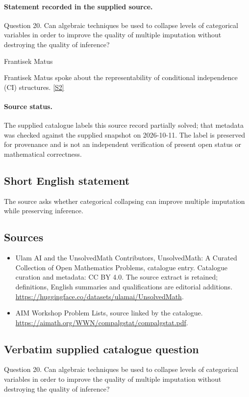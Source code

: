\documentclass[11pt]{article}
\begin{document}
\paragraph{Statement recorded in the supplied source.}
Question 20. Can algebraic techniques be used to collapse levels of categorical variables in order to improve the quality of multiple imputation without destroying the quality of inference?

Frantisek Matus

Frantisek Matus spoke about the representability of conditional independence (CI) structures. \href{https://aimath.org/WWN/compalgstat/compalgstat.pdf}{[S2]}
\paragraph{Source status.}
The supplied catalogue labels this source record partially solved; that metadata was checked against the supplied snapshot on 2026-10-11. The label is preserved for provenance and is not an independent verification of present open status or mathematical correctness.
\subsection{Short English statement}
The source asks whether categorical collapsing can improve multiple imputation while preserving inference.
\subsection{Sources}
\begin{itemize}
\item[S1] Ulam AI and the UnsolvedMath Contributors, UnsolvedMath: A Curated Collection of Open Mathematics Problems, catalogue entry. Catalogue curation and metadata: CC BY 4.0. The source extract is retained; definitions, English summaries and qualifications are editorial additions.
\url{https://huggingface.co/datasets/ulamai/UnsolvedMath}.
\item[S2] AIM Workshop Problem Lists, source linked by the catalogue.
\url{https://aimath.org/WWN/compalgstat/compalgstat.pdf}.
\end{itemize}
\subsection{Verbatim supplied catalogue question}
Question 20. Can algebraic techniques be used to collapse levels of categorical variables in order to improve the quality of multiple imputation without destroying the quality of inference?
\end{document}
